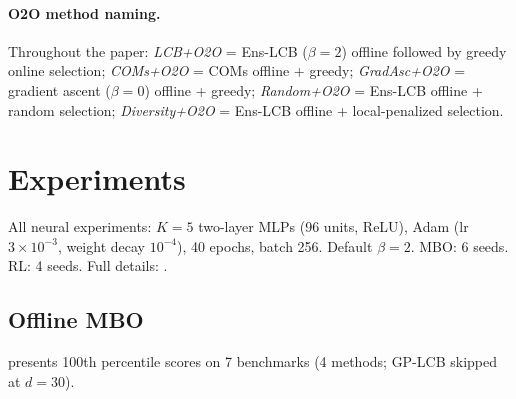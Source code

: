 \documentclass{article}
\theoremstyle{plain}
\theoremstyle{remark}
\newcommand{\method}{Ens-LCB}
\begin{document}
\paragraph{O2O method naming.}
Throughout the paper: \emph{LCB+O2O} = \method{} ($\beta{=}2$) offline followed by greedy online selection; \emph{COMs+O2O} = COMs offline + greedy; \emph{GradAsc+O2O} = gradient ascent ($\beta{=}0$) offline + greedy; \emph{Random+O2O} = \method{} offline + random selection; \emph{Diversity+O2O} = \method{} offline + local-penalized selection.

\section{Experiments}
\label{sec:experiments}

All neural experiments: $K{=}5$ two-layer MLPs (96 units, ReLU), Adam (lr $3{\times}10^{-3}$, weight decay $10^{-4}$), 40 epochs, batch 256.
Default $\beta{=}2$.
MBO: 6 seeds.
RL: 4 seeds.
Full details: .

\subsection{Offline MBO}
\label{sec:exp_mbo}

 presents 100th percentile scores on 7 benchmarks (4 methods; GP-LCB skipped at $d{=}30$).
\end{document}
